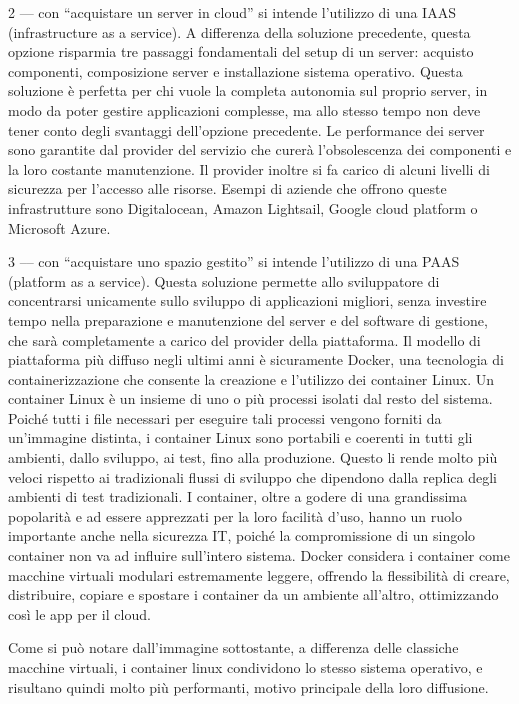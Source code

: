 \documentclass[12pt,a4paper]{article}
\begin{document}
2 --- con “acquistare un server in cloud” si intende l’utilizzo di una IAAS (infrastructure as a service). A differenza della soluzione precedente, questa opzione risparmia tre passaggi fondamentali del setup di un server: acquisto componenti, composizione server e installazione sistema operativo.
Questa soluzione è perfetta per chi vuole la completa autonomia sul proprio server, in modo da poter gestire applicazioni complesse, ma allo stesso tempo non deve tener conto degli svantaggi dell’opzione precedente. Le performance dei server sono garantite dal provider del servizio che curerà l’obsolescenza dei componenti e la loro costante manutenzione. Il provider inoltre si fa carico di alcuni livelli di sicurezza per l’accesso alle risorse. Esempi di aziende che offrono queste infrastrutture sono Digitalocean, Amazon Lightsail, Google cloud platform o Microsoft Azure.

3 –-- con “acquistare uno spazio gestito” si intende l’utilizzo di una PAAS (platform as a service). Questa soluzione permette allo sviluppatore di concentrarsi unicamente sullo sviluppo di applicazioni migliori, senza investire tempo nella preparazione e manutenzione del server e del software di gestione, che sarà completamente a carico del provider della piattaforma.
Il modello di piattaforma più diffuso negli ultimi anni è sicuramente Docker, una tecnologia di containerizzazione che consente la creazione e l'utilizzo dei container Linux.
Un container Linux è un insieme di uno o più processi isolati dal resto del sistema. Poiché tutti i file necessari per eseguire tali processi vengono forniti da un'immagine distinta, i container Linux sono portabili e coerenti in tutti gli ambienti, dallo sviluppo, ai test, fino alla produzione. Questo li rende molto più veloci rispetto ai tradizionali flussi di sviluppo che dipendono dalla replica degli ambienti di test tradizionali. I container, oltre a godere di una grandissima popolarità e ad essere apprezzati per la loro facilità d'uso, hanno un ruolo importante anche nella sicurezza IT, poiché la compromissione di un singolo container non va ad influire sull’intero sistema.
Docker considera i container come macchine virtuali modulari estremamente leggere, offrendo la flessibilità di creare, distribuire, copiare e spostare i container da un ambiente all'altro, ottimizzando così le app per il cloud.

Come si può notare dall’immagine sottostante, a differenza delle classiche macchine virtuali, i container linux condividono lo stesso sistema operativo, e risultano quindi molto più performanti, motivo principale della loro diffusione.
\end{document}
